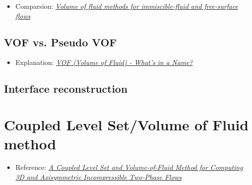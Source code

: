 \begin{itemize}
    \item Comparsion: \textit{\href{http://capfluidicslit.mme.pdx.edu/reference/Numerics/Gopala_ChemEngJ2008_VOFMethodsFreeSurfaceFlow.pdf}{Volume of fluid methods for immiscible-fluid and free-surface flows}}
\end{itemize}

\subsection{VOF vs. Pseudo VOF}

\begin{itemize}
    \item Explanation: \textit{\href{http://www.flow3d.com/cfd-101/cfd-101-VOF.html}{VOF (Volume of Fluid) - What's in a Name?}}
\end{itemize}

\subsection{Interface reconstruction}

\section{Coupled Level Set/Volume of Fluid  method}

\begin{itemize}
    \item Reference: \textit{\href{http://pages.csam.montclair.edu/~yecko/icodes/SussmanPuckett_LevelSetVOF.pdf}{A Coupled Level Set and Volume-of-Fluid Method for Computing 3D and Axisymmetric Incompressible Two-Phase Flows}}
\end{itemize}